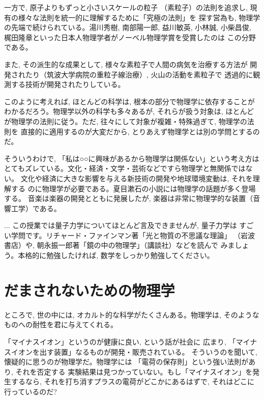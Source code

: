 一方で, 原子よりもずっと小さいスケールの粒子
（素粒子）の法則を追求し, 現有の様々な法則を統一的に理解するために「究極の法則」を
探す営為も, 物理学の先端で続けられている。湯川秀樹, 南部陽一郎, 益川敏英, 小林誠, 
小柴昌俊, 梶田隆章といった日本人物理学者がノーベル物理学賞を受賞したのは
この分野である。

また, その派生的な成果として, 様々な素粒子で人間の病気を治療する方法が
開発されたり（筑波大学病院の重粒子線治療）, 火山の活動を素粒子で
透過的に観測する技術が開発されたりしている。

このように考えれば, ほとんどの科学は, 根本の部分で物理学に依存することが
わかるだろう。物理学以外の科学も多々あるが, それらが扱う対象は, ほとんど
が物理学の法則に従う。ただ, 往々にして対象が複雑・特殊過ぎて, 物理学の法則を
直接的に適用するのが大変だから, とりあえず物理学とは別の学問とするのだ。

そういうわけで, 「私は○○に興味があるから物理学は関係ない」という考え方は
とてもズレている。文化・経済・文学・芸術などですら物理学と無関係ではない。
文化や経済に大きな影響を与える新技術の開発や地球環境変動は, それを理解する
のに物理学が必要である。夏目漱石の小説には物理学の話題が多く登場する。
音楽は楽器の開発とともに発展したが, 楽器は非常に物理学的な装置（音響工学）である。\mv

\begin{faq}{\small{}
... この授業では量子力学についてほとんど言及できませんが, 量子力学は
すごい学問です。リチャード・ファインマン著「光と物質の不思議な理論」
（岩波書店）や, 朝永振一郎著「鏡の中の物理学」（講談社）などを読んで
みましょう。本格的に勉強したければ, 数学をしっかり勉強してください。}\end{faq}
\hv


\section{だまされないための物理学}

ところで, 世の中には, オカルト的な科学がたくさんある。物理学は, 
そのようなものへの耐性を君に与えてくれる。

\begin{exmpl} 「マイナスイオン」というのが健康に良い, という話が社会に
広まり, 「マイナスイオンを出す装置」なるものが開発・販売されている。
そういうのを聞いて, 懐疑的に思うのが物理学だ。物理学には
「電荷の保存則」という強い法則があり, それを否定する
実験結果は見つかっていない。もし「マイナスイオン」を発生するなら, 
それを打ち消すプラスの電荷がどこかにあるはずで, それはどこに
行っているのだ?
\end{exmpl}

